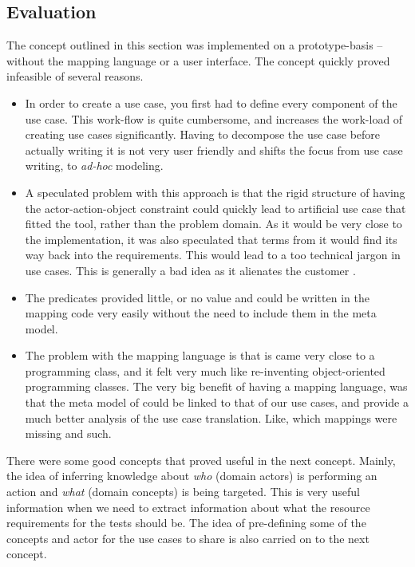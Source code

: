 \subsection{Evaluation}
The concept outlined in this section was implemented on a prototype-basis -- without the mapping language or a user interface. The concept quickly proved infeasible of several reasons.
\begin{itemize}
  \item In order to create a use case, you first had to define every component of the use case. This work-flow is quite cumbersome, and increases the work-load of creating use cases significantly. Having to decompose the use case before actually writing it is not very user friendly and shifts the focus from use case writing, to \emph{ad-hoc} modeling.
  
  \item A speculated problem with this approach is that the rigid structure of having the actor-action-object constraint could quickly lead to artificial use case that fitted the tool, rather than the problem domain. As it would be very close to the implementation, it was also speculated that terms from it would find its way back into the requirements. This would lead to a too technical jargon in use cases. This is generally a bad idea as it alienates the customer \cite{christel1992}.

  \item The predicates provided little, or no value and could be written in the mapping code very easily without the need to include them in the meta model.

  \item The problem with the mapping language is that is came very close to a programming class, and it felt very much like re-inventing object-oriented programming classes. The very big benefit of having a mapping language, was that the meta model of could be linked to that of our use cases, and provide a much better analysis of the use case translation. Like, which mappings were missing and such.

\end{itemize}
There were some good concepts that proved useful in the next concept. Mainly, the idea of inferring knowledge about \emph{who} (domain actors) is performing an action and \emph{what} (domain concepts) is being targeted. This is very useful information when we need to extract information about what the resource requirements for the tests should be. The idea of pre-defining some of the concepts and actor for the use cases to share is also carried on to the next concept.


